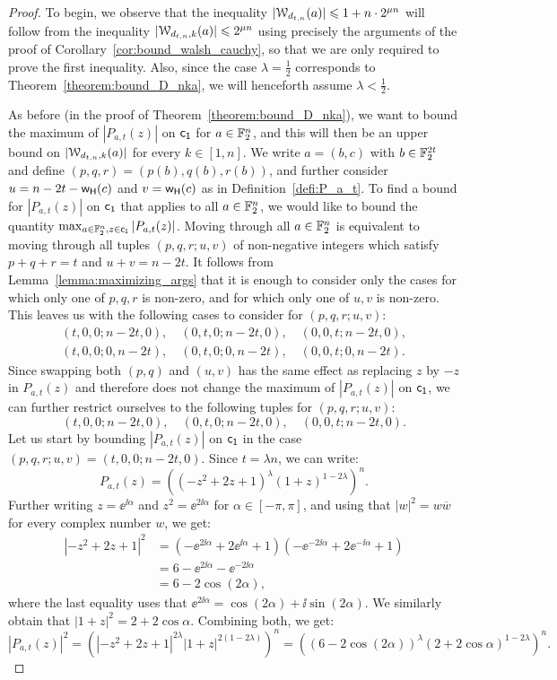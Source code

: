 \documentclass[11pt]{llncs}
\begin{document}
\begin{proof}
    To begin, we observe that the inequality $|\mathcal W_{d_{t,n}}(a)|\leqslant 1+n\cdot 2^{\mu n}$ will follow from the inequality $|\mathcal{W}_{d_{t,n},k}(a)|\leqslant 2^{\mu n}$ using precisely the arguments of the proof of Corollary~\ref{cor:bound_walsh_cauchy}, so that we are only required to prove the first inequality. Also, since the case $\lambda=\frac 12$ corresponds to Theorem~\ref{theorem:bound_D_nka}, we will henceforth assume $\lambda<\frac 12$.
    
    As before (in the proof of Theorem~\ref{theorem:bound_D_nka}), we want to bound the maximum of $|P_{a,t}(z)|$ on $\mathsf{c_1}$ for $a\in\mathbb{F}_2^n$, and this will then be an upper bound on $|\mathcal{W}_{d_{t,n},k}(a)|$ for every $k\in[1,n]$. 
    We write $a=(b,c)$ with $b\in\mathbb{F}_2^{2t}$ and define $(p,q,r)=(p(b),q(b),r(b))$, and further consider $u=n-2t-\mathsf{w_H}(c)$ and $v=\mathsf{w_H}(c)$ as in Definition~\ref{defi:P_a_t}.    
   To find a bound for $|P_{a,t}(z)|$ on $\mathsf{c_1}$ that applies to all $a\in\mathbb{F}_2^n$, we would like to bound the quantity $\max_{a\in\mathbb{F}_2^n,z\in\mathsf{c_1}}|P_{a,t}(z)|$. Moving through all $a\in\mathbb{F}_2^n$ is equivalent to moving through all tuples $(p,q,r;u,v)$ of non-negative integers which satisfy $p+q+r=t$ and $u+v=n-2t$. It follows from Lemma~\ref{lemma:maximizing_args} that it is enough to consider only the cases for which only one of $p,q,r$ is non-zero, and for which only one of $u,v$ is non-zero. 
   This leaves us with the following cases to consider for $(p,q,r;u,v)$:
    \begin{gather*}
        (t,0,0;n-2t,0),\quad(0,t,0;n-2t,0),\quad(0,0,t;n-2t,0),\\
         (t,0,0;0,n-2t),\quad(0,t,0;0,n-2t),\quad(0,0,t;0,n-2t).
    \end{gather*}
    Since swapping both $(p,q)$ and $(u,v)$ has the same effect as replacing $z$ by $-z$ in $P_{a,t}(z)$ and therefore does not change the maximum of $|P_{a,t}(z)|$ on $\mathsf{c_1}$, we can further restrict ourselves to the following tuples for $(p,q,r;u,v)$:
    \[
        (t,0,0;n-2t,0),\quad(0,t,0;n-2t,0),\quad(0,0,t;n-2t,0).
    \]
    Let us start by bounding $|P_{a,t}(z)|$ on $\mathsf{c_1}$ in the case $(p,q,r;u,v)=(t,0,0;n-2t,0)$. Since $t=\lambda n$, we can write:
    \[
        P_{a,t}(z)=\left((-z^2+2z+1)^{\lambda}(1+z)^{1-2\lambda}\right)^n.
    \]
    Further writing $z=\ee^{\ii\alpha}$ and $z^2=\ee^{2\ii\alpha}$ for $\alpha\in[-\pi,\pi]$, and using that $|w|^2=w\overline w$ for every complex number $w$, we get:
    \begin{align*}
        |-z^2+2z+1|^2&=\left(-\ee^{2\ii\alpha}+2\ee^{\ii\alpha}+1\right)\left(-\ee^{-2\ii\alpha}+2\ee^{-\ii\alpha}+1\right)\\
        &=6-\ee^{2\ii\alpha}-\ee^{-2\ii\alpha}\\
        &=6-2\cos (2\alpha),
    \end{align*}
    where the last equality uses that $\ee^{2\ii\alpha}=\cos(2\alpha)+\ii\sin(2\alpha)$. We similarly obtain that $|1+z|^2=2+2\cos\alpha$. Combining both, we get:   
    \[
        |P_{a,t}(z)|^2=\left(\left|-z^2+2z+1\right|^{2\lambda}|1+z|^{2(1-2\lambda)}\right)^n=\left((6-2\cos(2\alpha))^\lambda(2+2\cos\alpha)^{1-2\lambda}\right)^n.
    \]
    

\end{proof}
\end{document}
